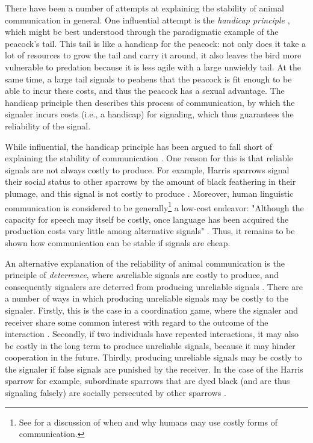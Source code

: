 There have been a number of attempts at explaining the stability of animal communication in general. One influential attempt is the \emph{handicap principle} \citep{Zahavi75, Zahavi99}, which might be best understood through the paradigmatic example of the peacock's tail.
This tail is like a handicap for the peacock: not only does it take a lot of resources to grow the tail and carry it around, it also leaves the bird more vulnerable to predation because it is less agile with a large unwieldy tail. At the same time, a large tail signals to peahens that the peacock is fit enough to be able to incur these costs, and thus the peacock has a sexual advantage.
The handicap principle then describes this process of communication, by which the signaler incurs costs (i.e., a handicap) for signaling, which thus guarantees the reliability of the signal.

While influential, the handicap principle has been argued to fall short of explaining the stability of communication \citep{Penn20, Scott-Phillips08}.
One reason for this is that reliable signals are not always costly to produce. For example, Harris sparrows signal their social status to other sparrows by the amount of black feathering in their plumage, and this signal is not costly to produce \citep[p.~13191]{Lachmann01}.
Moreover, human linguistic communication is considered to be generally\footnote{See \citet[p.~13193]{Lachmann01} for a discussion of when and why humans may use costly forms of communication.} a low-cost endeavor: "Although the capacity for speech may itself be costly, once language has been acquired the production costs vary little among alternative signals" \citep[p.~13192]{Lachmann01}.
Thus, it remains to be shown how communication can be stable if signals are cheap.

An alternative explanation of the reliability of animal communication is the principle of \emph{deterrence}, where \emph{un}reliable signals are costly to produce, and consequently signalers are deterred from producing unreliable signals \citep{Scott-Phillips08}.
There are a number of ways in which producing unreliable signals may be costly to the signaler. Firstly, this is the case in a coordination game, where the signaler and receiver share some common interest with regard to the outcome of the interaction \citep[see][]{Smith94}.
Secondly, if two individuals have repeated interactions, it may also be costly in the long term to produce unreliable signals, because it may hinder cooperation in the future.
Thirdly, producing unreliable signals may be costly to the signaler if false signals are punished by the receiver. In the case of the Harris sparrow for example, subordinate sparrows that are dyed black (and are thus signaling falsely) are socially persecuted by other sparrows \citep{Rohwer78}.

